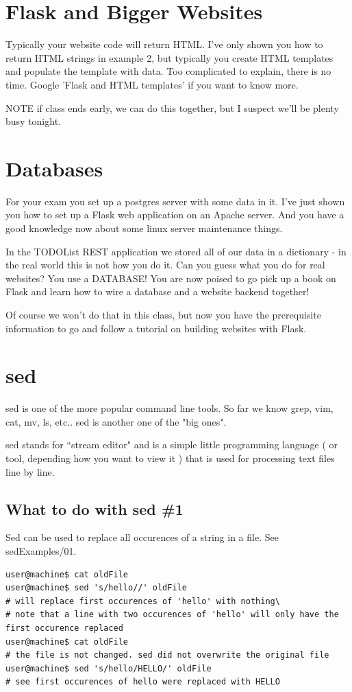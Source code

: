 \documentclass[10pt]{article}
\begin{document}
\pagebreak

\section{Flask and Bigger Websites}
Typically your website code will return HTML. I've only shown you how to return HTML strings in example 2, but typically you create HTML templates and populate the template with data. Too complicated to explain, there is no time. Google 'Flask and HTML templates' if you want to know more.

NOTE if class ends early, we can do this together, but I suspect we'll be plenty busy tonight.

\section{Databases}
For your exam you set up a postgres server with some data in it. I've just shown you how to set up a Flask web application on an Apache server. And you have a good knowledge now about some linux server maintenance things. 

In the TODOList REST application we stored all of our data in a dictionary - in the real world this is not how you do it. Can you guess what you do for real websites? You use a DATABASE! You are now poised to go pick up a book on Flask and learn how to wire a database and a website backend together!

Of course we won't do that in this class, but now you have the prerequisite information to go and follow a tutorial on building websites with Flask.

\section{sed}
sed is one of the more popular command line tools. So far we know grep, vim, cat, mv, ls, etc.. sed is another one of the "big ones".

sed stands for ``stream editor" and is a simple little programming language ( or tool, depending how you want to view it ) that is used for processing text files line by line.

\subsection{What to do with sed \#1}
Sed can be used to replace all occurences of a string in a file.
See sedExamples/01.

\begin{lstlisting}[style=term]
user@machine$ cat oldFile
user@machine$ sed 's/hello//' oldFile
# will replace first occurences of 'hello' with nothing\
# note that a line with two occurences of 'hello' will only have the first occurence replaced
user@machine$ cat oldFile
# the file is not changed. sed did not overwrite the original file
user@machine$ sed 's/hello/HELLO/' oldFile
# see first occurences of hello were replaced with HELLO
\end{lstlisting}
\end{document}
